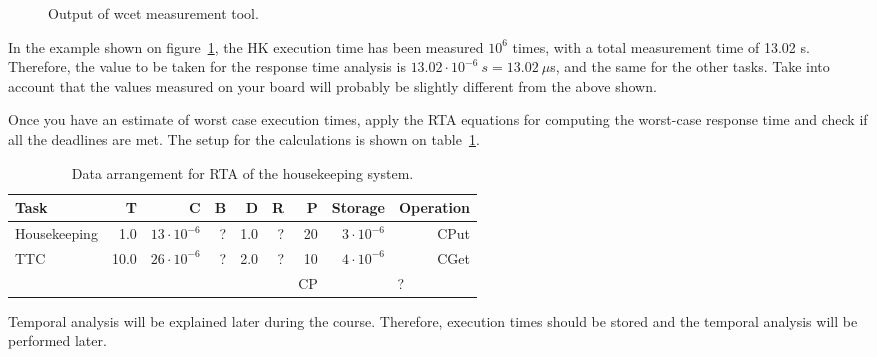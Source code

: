 \begin{figure}[h]
            \caption{Output of wcet measurement tool.}
            \label{fig:wcet}
\end{figure}

In the example shown on figure~\ref{fig:wcet}, the HK execution time has been measured $10^{6}$ times, with a total measurement time of 13.02 s. Therefore, the value to be taken for the response time analysis is $13.02\cdot10^{-6}~s = 13.02~\mu${s}, and the same for the other tasks. Take into account that the values measured on your board will probably be slightly different from the above shown.

Once you have an estimate of worst case execution times, apply the RTA equations for computing the worst-case response time and check if all the deadlines are met. The setup for the calculations is shown on table~\ref{tb:wcet}.

\begin{table}[htb]
\begin{center}
\begin{tabular}{|l|r|r|r|r|r|r|r|r|} \hline
Task & T & C & B & D & R & P & Storage & Operation\\ \hline
Housekeeping & 1.0 & $13\cdot10^{-6}$ & ? & 1.0 & ? & 20 & $3\cdot10^{-6}$ & CPut \\
TTC & 10.0 & $26\cdot10^{-6}$ & ? & 2.0 & ? & 10 & $4\cdot10^{-6}$ & CGet \\ \hline
& & & & & & CP & \multicolumn{2}{|c|}{?} \\ \hline
\end{tabular}
\caption{Data arrangement for RTA of the housekeeping system.}
\label{tb:wcet}
\end{center}
\end{table}

Temporal analysis will be explained later during the course. Therefore, execution times should be stored and the temporal analysis will be performed later. 

